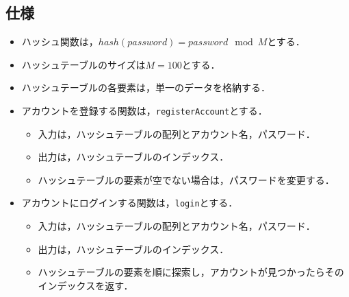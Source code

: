 \documentclass{ltjsarticle}
\begin{document}
\subsection{仕様}
\begin{itemize}
    \item ハッシュ関数は，$hash(password) = password \mod M$とする．
    \item ハッシュテーブルのサイズは$M = 100$とする．
    \item ハッシュテーブルの各要素は，単一のデータを格納する．
    \item アカウントを登録する関数は，\texttt{registerAccount}とする．
    \begin{itemize}
      \item 入力は，ハッシュテーブルの配列とアカウント名，パスワード．
      \item 出力は，ハッシュテーブルのインデックス．
      \item ハッシュテーブルの要素が空でない場合は，パスワードを変更する．
    \end{itemize}
    \item アカウントにログインする関数は，\texttt{login}とする．
    \begin{itemize}
      \item 入力は，ハッシュテーブルの配列とアカウント名，パスワード．
      \item 出力は，ハッシュテーブルのインデックス．
      \item ハッシュテーブルの要素を順に探索し，アカウントが見つかったらそのインデックスを返す．
    \end{itemize}
\end{itemize}
\end{document}
